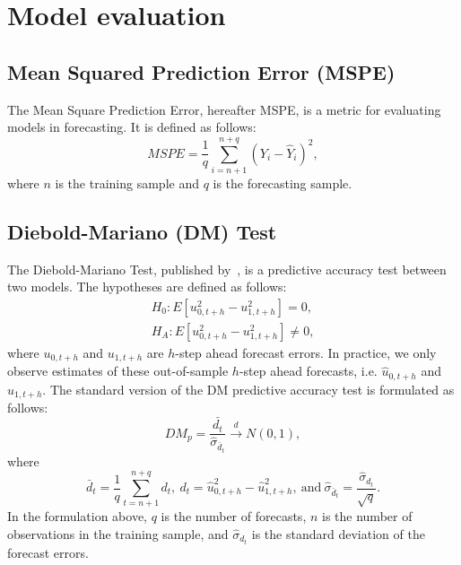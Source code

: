 \section{Model evaluation}
\subsection{Mean Squared Prediction Error (MSPE)}
\label{sec:mspe}
The Mean Square Prediction Error, hereafter MSPE, is a metric for evaluating models in forecasting.
It is defined as follows:
\begin{equation}
	MSPE = \frac{1}{q} \sum_{i=n+1}^{n+q} \left(Y_i - \hat{Y}_i \right)^2,
\end{equation}
where $n$ is the training sample and $q$ is the forecasting sample.

\subsection{Diebold-Mariano (DM) Test}
\label{sec:dmtest}
The Diebold-Mariano Test, published by~\textcite[hereafter DM]{diebold_comparing_1994}, is a predictive accuracy test between two models. 
The hypotheses are defined as follows:
\begin{align*}
	H_0 : E\left[u_{0,t+h}^2 - u_{1,t+h}^2\right] = 0, \\
	H_A : E\left[u_{0,t+h}^2 - u_{1,t+h}^2\right] \neq 0,
\end{align*}
where $u_{0,t+h}$ and $u_{1,t+h}$ are $h$-step ahead forecast errors. 
In practice, we only observe estimates of these out-of-sample $h$-step ahead forecasts, i.e. $\hat{u}_{0,t+h}$ and $\hat{u}_{1,t+h}$. 
The standard version of the DM predictive accuracy test is formulated as follows:
\begin{equation}
	DM_p = \frac{\bar{d_t}}{\hat{\sigma}_{\bar{d}_t}} \overset{d}{\rightarrow} N(0,1),
\end{equation}
where
\begin{equation}
	\bar{d}_t = \frac{1}{q} \sum_{t=n+1}^{n+q} d_t,\ d_t = \hat{u}_{0,t+h}^2 - \hat{u}_{1,t+h}^2,\ \text{and}\ \hat{\sigma}_{\bar{d}_t} = \frac{\hat{\sigma}_{d_t}}{\sqrt{q}}.
\end{equation}
In the formulation above, $q$ is the number of forecasts, $n$ is the number of observations in the training sample, and $\hat{\sigma}_{d_t}$ is the standard deviation of the forecast errors.
